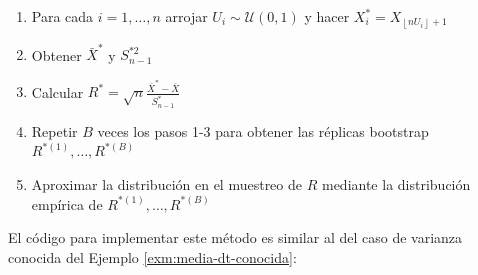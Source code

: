 \documentclass[]{book}
\theoremstyle{definition}
\theoremstyle{definition}
\theoremstyle{definition}
\theoremstyle{remark}
\begin{document}
\begin{enumerate}
\def\labelenumi{\arabic{enumi}.}
\item
  Para cada \(i=1,\ldots ,n\) arrojar
  \(U_i\sim \mathcal{U}\left( 0,1 \right)\) y hacer
  \(X_i^{\ast}=X_{\left\lfloor nU_i\right\rfloor +1}\)
\item
  Obtener \(\bar{X}^{\ast}\) y \(S_{n-1}^{\ast 2}\)
\item
  Calcular
  \(R^{\ast}=\sqrt{n}\frac{\bar{X}^{\ast}-\bar{X}}{ S_{n-1}^{\ast}}\)
\item
  Repetir \(B\) veces los pasos 1-3 para obtener las réplicas bootstrap
  \(R^{\ast (1)}, \ldots, R^{\ast (B)}\)
\item
  Aproximar la distribución en el muestreo de \(R\) mediante la
  distribución empírica de \(R^{\ast (1)}, \ldots, R^{\ast (B)}\)
\end{enumerate}

El código para implementar este método es similar al del caso de
varianza conocida del Ejemplo \ref{exm:media-dt-conocida}:
\end{document}
